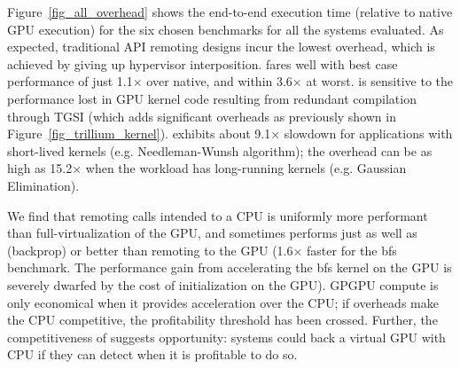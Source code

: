 Figure~\ref{fig_all_overhead} shows the end-to-end execution time (relative to
native GPU execution) for the six chosen benchmarks for all the systems evaluated. As
expected, traditional API remoting designs incur the lowest overhead, which is
achieved by giving up hypervisor interposition.
\Trillium fares well with best case performance
of just 1.1$\times$ over native, and within 3.6$\times$ at worst. \XenSVGA is
sensitive to the performance lost in GPU kernel code resulting from redundant
compilation through TGSI (which adds significant overheads as previously shown in
Figure~\ref{fig_trillium_kernel}). \gpuvmopt exhibits about 9.1$\times$ slowdown for
applications with short-lived kernels (e.g. Needleman-Wunsh algorithm); the
overhead can be as high as 15.2$\times$ when the workload has long-running
kernels (e.g. Gaussian Elimination).

We find that remoting calls intended to a CPU is uniformly more
performant than full-virtualization of the GPU, and sometimes performs just as well as (backprop)
or better than remoting to the GPU (1.6$\times$ faster for the bfs benchmark. The performance gain
from accelerating the bfs kernel on the GPU is severely dwarfed by the cost of initialization on
the GPU).
GPGPU compute is only economical when it provides acceleration over the CPU;
if overheads make the CPU competitive, the profitability threshold has been crossed.
Further, the competitiveness of \apicpu suggests opportunity: systems could back a virtual
GPU with CPU if they can detect when it is profitable to do so.


